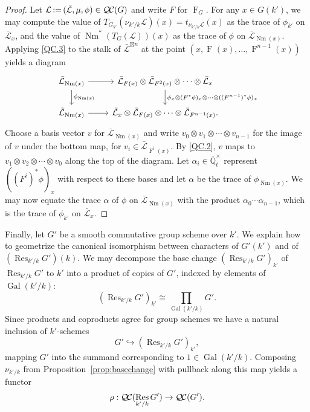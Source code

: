 \documentclass[CM,Submssn,SecEq]{degruyter-crelle} %
\theoremstyle{plain}
\theoremstyle{definition}
\theoremstyle{remark}
\newcommand{\EE}{\mathbb{\bar Q}_\ell}
\newcommand{\EEx}{\EE^\times}
\DeclareMathOperator{\Gal}{Gal}
\newcommand{\Frob}[1]{\operatorname{F}_{#1}}
\DeclareMathOperator{\Res}{Res}
\DeclareMathOperator{\Nm}{Nm}
\newcommand{\ceq}{{\, :=\, }}
\newcommand{\TrFrob}[1]{T_{#1}}
\newcommand{\qcs}[1]{{\mathcal{#1}}}
\newcommand{\gqcs}[1]{{\mathcal{\bar #1}}}
\newcommand{\QC}{{\mathcal{Q\hskip-0.8pt C}}}
\begin{document}
\begin{proof}
Let $\qcs{L} \ceq (\gqcs{L}, \mu, \phi) \in \QC(G)$ and write $F$ for $\Frob{G}$.  For any $x \in G(k')$,
we may compute the value of $\TrFrob{G_{k'}}(\nu_{k'/k}\qcs{L})(x)= t_{\nu_{k'/k}\qcs{L}}(x)$ as the trace of $\phi_{k'}$ on $\gqcs{L}_x$,
and the value of $\Nm^*(\TrFrob{G}(\qcs{L}))(x)$ as the trace of $\phi$ on $\gqcs{L}_{\Nm(x)}$.
Applying \ref{QC.3} to the stalk of $\gqcs{L}^{\boxtimes n}$ at the point $(x, \Frob{}(x), \ldots, \Frob{}^{n-1}(x))$ yields a diagram
\[
\begin{tikzcd}
\gqcs{L}_{\Nm(x)} \rar \dar{\phi_{\Nm(x)}} & \gqcs{L}_{F(x)} \otimes \gqcs{L}_{F^2(x)} \otimes \cdots \otimes \gqcs{L}_x
\dar{\phi_x \otimes (F^*\phi)_x \otimes \cdots \otimes ((F^{n-1})^*\phi)_x} \\
\gqcs{L}_{\Nm(x)} \rar & \gqcs{L}_x \otimes \gqcs{L}_{F(x)} \otimes \cdots \otimes \gqcs{L}_{F^{n-1}(x)}.
\end{tikzcd}
\]
Choose a basis vector $v$ for $\gqcs{L}_{\Nm(x)}$ and write $v_0 \otimes v_1 \otimes \cdots \otimes v_{n-1}$ for the image of $v$ under the
bottom map,
for $v_i \in \gqcs{L}_{\Frob{}^i(x)}$.  By \ref{QC.2}, $v$ maps to
$v_1 \otimes v_2 \otimes \cdots \otimes v_0$ along the top of the diagram.
Let $\alpha_i \in \EEx$ represent $((F^i)^*\phi)_x$ with respect to these bases and let $\alpha$ be
the trace of $\phi_{\Nm(x)}$.  We may now equate the trace $\alpha$ of $\phi$ on $\gqcs{L}_{\Nm(x)}$
with the product $\alpha_0 \cdots \alpha_{n-1}$, which is the trace of $\phi_{k'}$ on $\gqcs{L}_x$.
\end{proof}

Finally, let $G'$ be a smooth commutative group scheme over $k'$.
We explain how to geometrize the canonical isomorphism between characters of $G'(k')$ and of $(\Res_{k'/k}G')(k)$.
We may decompose the base change $(\Res_{k'/k}G')_{k'}$ of $\Res_{k'/k}G'$ to $k'$
into a product of copies of $G'$, indexed by elements of $\Gal(k'/k)$:
\[
(\Res_{k'/k}G')_{k'} \cong \prod_{\Gal(k'/k)} G'.
\]
Since products and coproducts agree for group schemes we have a natural inclusion of $k'$-schemes
\[
G' \hookrightarrow (\Res_{k'/k}G')_{k'},
\]
mapping $G'$ into the summand corresponding to $1 \in \Gal(k'/k)$.  Composing $\nu_{k'/k}$
from Proposition~\ref{prop:basechange} with pullback along this map yields a functor
\[
\rho : \QC(\Res_{k'/k}G') \to \QC(G').
\]
\end{document}
